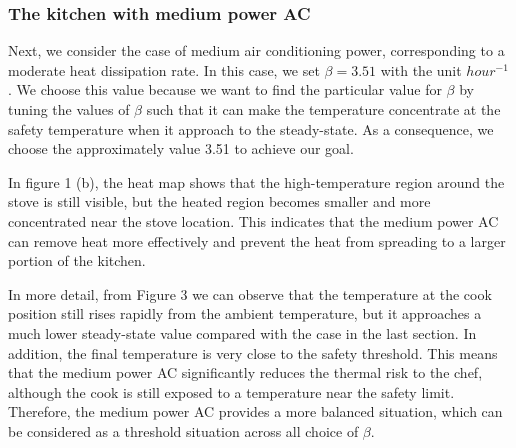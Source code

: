 \documentclass{article}
\begin{document}
\subsubsection{The kitchen with medium power AC}

Next, we consider the case of medium air conditioning power, corresponding to a moderate heat dissipation rate. In this case, we set $\beta = 3.51$ with the unit $hour^{-1}$. We choose this value because we want to find the particular value for $\beta$ by tuning the values of $\beta$ such that it can make the temperature concentrate at the safety temperature when it approach to the steady-state. As a consequence, we choose the approximately value 3.51 to achieve our goal. 

\vspace{3mm}

\noindent In figure 1 (b), the heat map shows that the high-temperature region around the stove is still visible, but the heated region becomes smaller and more concentrated near the stove location. This indicates that the medium power AC can remove heat more effectively and prevent the heat from spreading to a larger portion of the kitchen.

\vspace{3mm}


\noindent In more detail, from Figure 3 we can observe that the temperature at the cook position still rises rapidly from the ambient temperature, but it approaches a much lower steady-state value compared with the case in the last section. In addition, the final temperature is very close to the safety threshold. This means that the medium power AC significantly reduces the thermal risk to the chef, although the cook is still exposed to a temperature near the safety limit. Therefore, the medium power AC provides a more balanced situation, which can be considered as a threshold situation across all choice of $\beta$.
\end{document}
